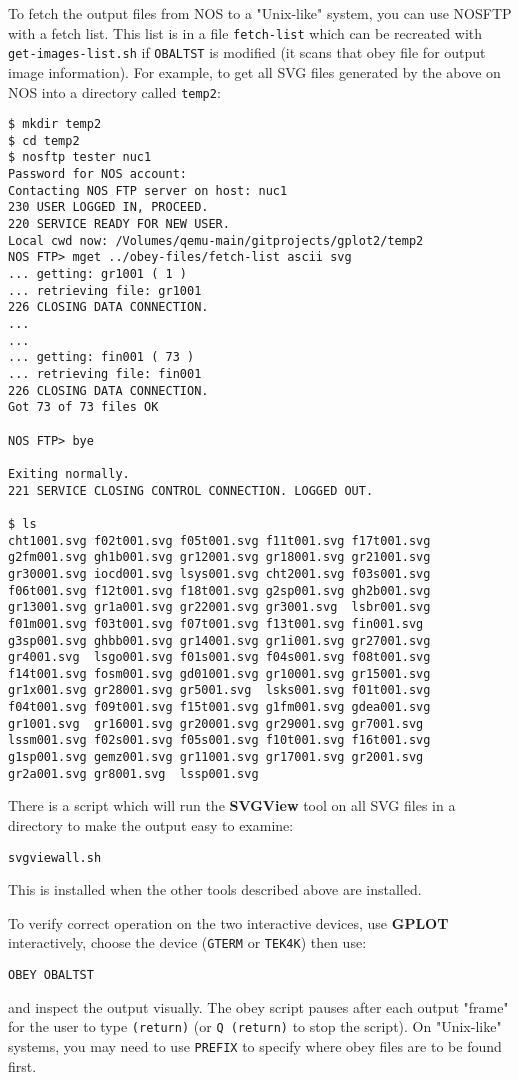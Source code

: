 \documentclass[a4paper,twoside,11pt]{article}
\newcommand{\newpara}{\par\vspace{4mm}\noindent}
\begin{document}
\newpara
To fetch the output files from NOS to a "Unix-like" system, you can use NOSFTP
with a fetch list. This list is in a file \texttt{fetch-list} which can be recreated
with \texttt{get-images-list.sh} if \texttt{OBALTST} is modified (it scans that obey file for
output image information). For example, to get all SVG files generated by the above
on NOS into a directory called \texttt{temp2}:
\begin{lstlisting}
$ mkdir temp2
$ cd temp2
$ nosftp tester nuc1
Password for NOS account: 
Contacting NOS FTP server on host: nuc1
230 USER LOGGED IN, PROCEED.
220 SERVICE READY FOR NEW USER.
Local cwd now: /Volumes/qemu-main/gitprojects/gplot2/temp2
NOS FTP> mget ../obey-files/fetch-list ascii svg
... getting: gr1001 ( 1 )
... retrieving file: gr1001
226 CLOSING DATA CONNECTION.
...
...
... getting: fin001 ( 73 )
... retrieving file: fin001
226 CLOSING DATA CONNECTION.
Got 73 of 73 files OK

NOS FTP> bye

Exiting normally.
221 SERVICE CLOSING CONTROL CONNECTION. LOGGED OUT.

$ ls
cht1001.svg f02t001.svg f05t001.svg f11t001.svg f17t001.svg	
g2fm001.svg gh1b001.svg gr12001.svg gr18001.svg gr21001.svg	
gr30001.svg iocd001.svg lsys001.svg cht2001.svg f03s001.svg	
f06t001.svg f12t001.svg f18t001.svg g2sp001.svg gh2b001.svg	
gr13001.svg gr1a001.svg gr22001.svg gr3001.svg  lsbr001.svg
f01m001.svg f03t001.svg f07t001.svg f13t001.svg fin001.svg	
g3sp001.svg ghbb001.svg gr14001.svg gr1i001.svg gr27001.svg	
gr4001.svg  lsgo001.svg f01s001.svg f04s001.svg f08t001.svg	
f14t001.svg fosm001.svg gd01001.svg gr10001.svg gr15001.svg	
gr1x001.svg gr28001.svg gr5001.svg  lsks001.svg f01t001.svg	
f04t001.svg f09t001.svg f15t001.svg g1fm001.svg gdea001.svg	
gr1001.svg  gr16001.svg gr20001.svg gr29001.svg gr7001.svg	
lssm001.svg f02s001.svg f05s001.svg f10t001.svg f16t001.svg	
g1sp001.svg gemz001.svg gr11001.svg gr17001.svg gr2001.svg	
gr2a001.svg gr8001.svg  lssp001.svg
\end{lstlisting}

\newpara
There is a script which will run the \textbf{SVGView} tool on all SVG
files in a directory to make the output easy to examine:
\begin{lstlisting}
svgviewall.sh
\end{lstlisting}
This is installed when the other tools described above are
installed.

\newpara
To verify correct operation on the two interactive devices,
use \textbf{GPLOT} interactively, choose the device
(\texttt{GTERM} or \texttt{TEK4K}) then use:
\begin{lstlisting}
OBEY OBALTST
\end{lstlisting}
and inspect the output visually. The obey script pauses
after each output "frame" for the user to type \texttt{(return)}
(or \texttt{Q (return)} to stop the script). On "Unix-like"
systems, you may need to use \texttt{PREFIX} to specify where obey
files are to be found first.
\end{document}
